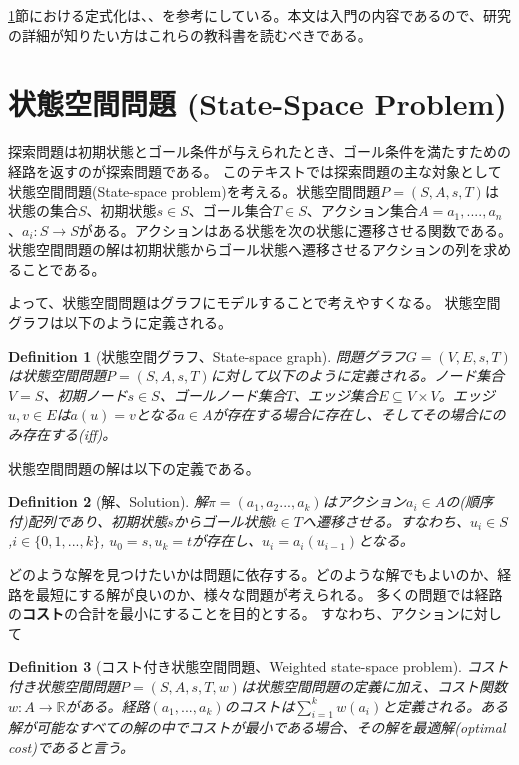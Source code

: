 \documentclass{report}
\newtheorem{definition}{Definition}
\begin{document}
\ref{sec:state-space-problem}節における定式化は\cite{russelln03}、\cite{pearl84}、\cite{edelkamp:2010:hst:1875144}を参考にしている。本文は入門の内容であるので、研究の詳細が知りたい方はこれらの教科書を読むべきである。

\section{状態空間問題 (State-Space Problem)}
\label{sec:state-space-problem}
探索問題は初期状態とゴール条件が与えられたとき、ゴール条件を満たすための経路を返すのが探索問題である。
このテキストでは探索問題の主な対象として状態空間問題(State-space problem)を考える。状態空間問題$P = (S, A, s, T)$は状態の集合$S$、初期状態$s \in S$、ゴール集合$T \in S$、アクション集合$A = {a_1, ....,a_n}$、$a_i : S \rightarrow S$がある。アクションはある状態を次の状態に遷移させる関数である。
状態空間問題の解は初期状態からゴール状態へ遷移させるアクションの列を求めることである。

よって、状態空間問題はグラフにモデルすることで考えやすくなる。
状態空間グラフは以下のように定義される。

\begin{definition}[状態空間グラフ、State-space graph]
問題グラフ$G = (V, E, s, T)$は状態空間問題$P = (S, A, s, T)$に対して以下のように定義される。ノード集合 $V = S$、初期ノード$s \in S$、ゴールノード集合$T$、エッジ集合$E\subseteq V \times V$。エッジ$u,v\in E$は$a(u) = v$となる$a\in A$が存在する場合に存在し、そしてその場合にのみ存在する(iff)。
\end{definition}

状態空間問題の解は以下の定義である。

\begin{definition}[解、Solution]
解$\pi = (a_1,a_2...,a_k)$はアクション$a_i \in A$の(順序付)配列であり、初期状態$s$からゴール状態$t \in T$へ遷移させる。すなわち、$u_i \in S$,$i \in \{0,1,...,k\}$, $u_0 = s, u_k = t$が存在し、$u_i = a_i(u_{i-1})$となる。
\end{definition}

どのような解を見つけたいかは問題に依存する。どのような解でもよいのか、経路を最短にする解が良いのか、様々な問題が考えられる。
多くの問題では経路の{\bf コスト}の合計を最小にすることを目的とする。
すなわち、アクションに対して

\begin{definition}[コスト付き状態空間問題、Weighted state-space problem]
コスト付き状態空間問題$P = (S, A, s, T, w)$は状態空間問題の定義に加え、コスト関数$w: A \rightarrow \mathbb{R}$がある。経路$(a_1,...,a_k)$のコストは$\sum^k_{i=1}w(a_i)$と定義される。ある解が可能なすべての解の中でコストが最小である場合、その解を最適解(optimal cost)であると言う。
\end{definition}
\end{document}
